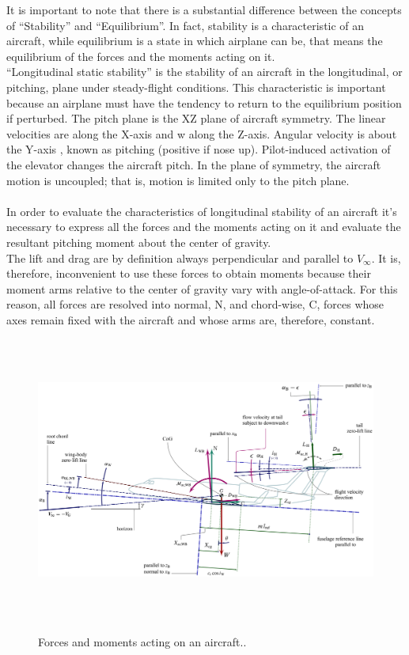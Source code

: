 It is important to note that there is a substantial difference between the concepts of ``Stability'' and ``Equilibrium''. In fact, stability is a characteristic of an aircraft, while equilibrium is a state in which airplane can be, that means the equilibrium of the forces and the moments acting on it.\\
``Longitudinal static stability'' is the stability of an aircraft in the longitudinal, or pitching, plane under steady-flight conditions. This characteristic is important because an airplane must have the tendency to return to the equilibrium position if perturbed. The pitch plane is the XZ plane of aircraft symmetry. The linear velocities are along the X-axis and w along the Z-axis. Angular velocity is about the Y-axis , known as pitching (positive if nose up). Pilot-induced activation of the elevator changes the aircraft pitch. In the plane of symmetry, the aircraft motion is uncoupled; that is, motion is limited only to the pitch plane.\cite{kundu}\\ \\
In order to evaluate the characteristics of longitudinal stability of an aircraft it's necessary to express all the forces and the moments acting on it and evaluate the resultant pitching moment about the center of gravity.\\
 The lift and drag are by definition always perpendicular and parallel to $V_{\infty}$. It is, therefore, inconvenient to use these forces to obtain moments because their moment arms relative to the center of gravity vary with angle-of-attack. For this reason, all forces are resolved into normal, N, and chord-wise, C, forces whose axes remain fixed with the aircraft and whose arms are, therefore, constant. \cite{nicolai2010fundamentals}\\

\begin{figure}[H]
\centering
{\includegraphics[height=9.4cm]{immagini/Longitudinal_Stability_Definitions_nc}} 
\label{longitudina}
\caption{Forces and moments acting on an aircraft..}
\end{figure} 	


